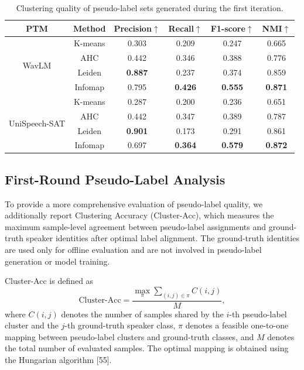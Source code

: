 \documentclass[lettersize,journal]{IEEEtran}
\begin{document}
\begin{table}[!t] 
    \centering
    \caption{Clustering quality of pseudo-label sets generated during the first iteration.} %
    \setlength{\tabcolsep}{4pt} %
    \begin{tabular}{c c c c c c} %
        \hline
        PTM & Method & Precision$\uparrow$ & Recall$\uparrow$ & F1-score$\uparrow$ & NMI$\uparrow$ \\
        \hline
        \multirow{4}{*}{WavLM}
        & K-means  & 0.303 & 0.209 & 0.247  & 0.665  \\ 
        & AHC  & 0.442 & 0.346 & 0.388  & 0.776  \\
        & Leiden  & \textbf{0.887} & 0.237 & 0.374  & 0.859  \\
        & Infomap & 0.795 & \textbf{0.426} & \textbf{0.555} &\textbf{0.871}  \\
        \hline
        \multirow{4}{*}{UniSpeech-SAT}
        & K-means  & 0.287 & 0.200 & 0.236  & 0.651  \\ 
        & AHC  & 0.442 & 0.347 & 0.389  & 0.787  \\
        & Leiden  & \textbf{0.901} & 0.173 & 0.291  & 0.861  \\
        & Infomap  & 0.697 & \textbf{0.364} & \textbf{0.579}&\textbf{0.872}  \\
        \hline
    \end{tabular}
    \label{tab:clustering}
\end{table}



\subsection{First-Round Pseudo-Label Analysis}
\label{sec:first_round_analysis}

To provide a more comprehensive evaluation of pseudo-label quality,
we additionally report Clustering Accuracy (Cluster-Acc), which
measures the maximum sample-level agreement between pseudo-label
assignments and ground-truth speaker identities after optimal label
alignment. The ground-truth identities are used only for offline
evaluation and are not involved in pseudo-label generation or model
training.

Cluster-Acc is defined as
\begin{equation}
\mathrm{Cluster\mbox{-}Acc}
=
\frac{
\max_{\pi}
\sum_{(i,j)\in\pi} C(i,j)
}{
M
},
\end{equation}
where $C(i,j)$ denotes the number of samples shared by the $i$-th
pseudo-label cluster and the $j$-th ground-truth speaker class,
$\pi$ denotes a feasible one-to-one mapping between pseudo-label
clusters and ground-truth classes, and $M$ denotes the total number
of evaluated samples. The optimal mapping is obtained using the
Hungarian algorithm [55].
\end{document}
